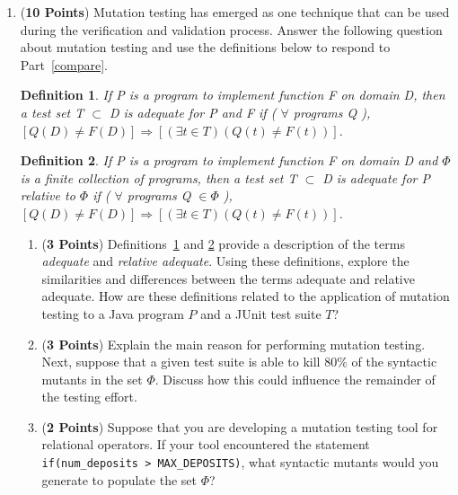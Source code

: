 \documentclass[12pt,epsf,psfig,graphics]{article}
\newtheorem{define}{Definition}
\begin{document}
\begin{enumerate}
\begin{enumerate}
\end{enumerate}

\newpage

\item ({\bf 10 Points}) Mutation testing has emerged as one technique
  that can be used during the verification and validation process.
  Answer the following question about mutation testing and use the
  definitions below to respond to Part~\ref{compare}.

\begin{define}

If P is a program to implement function F on domain D, then a test set
T $ \subset $ D is adequate for P and F if ( $\forall$ programs Q ),
$[Q(D) \neq F(D) ] \Rightarrow [(\exists t \in T) (Q(t) \neq F(t))]$.

\label{adeq}
\end{define}

\begin{define}

If P is a program to implement function F on domain D and $\Phi$ is a
finite collection of programs, then a test set T $ \subset $ D is
adequate for P relative to $\Phi$ if ( $\forall$ programs Q $\in \Phi$
), $[Q(D) \neq F(D) ] \Rightarrow [(\exists t \in T) (Q(t) \neq
  F(t))]$.

\label{rel}
\end{define}

\begin{enumerate}

\item \label{compare} ({\bf 3 Points}) Definitions~\ref{adeq} and
  \ref{rel} provide a description of the terms {\em adequate} and {\em
    relative adequate}.  Using these definitions, explore the
  similarities and differences between the terms adequate and relative
  adequate.  How are these definitions related to the application of
  mutation testing to a Java program $P$ and a JUnit test suite $T$?

\item \label{purpose} ({\bf 3 Points}) Explain the main reason for
  performing mutation testing. Next, suppose that a given test suite
  is able to kill $80\%$ of the syntactic mutants in the set $\Phi$.
  Discuss how this could influence the remainder of the testing
  effort.

\item ({\bf 2 Points}) Suppose that you are developing a mutation
  testing tool for relational operators.  If your tool encountered the
  statement {\tt if(num\_deposits > MAX\_DEPOSITS)}, what syntactic
  mutants would you generate to populate the set $\Phi$?


\end{enumerate}
\end{enumerate}
\end{document}
